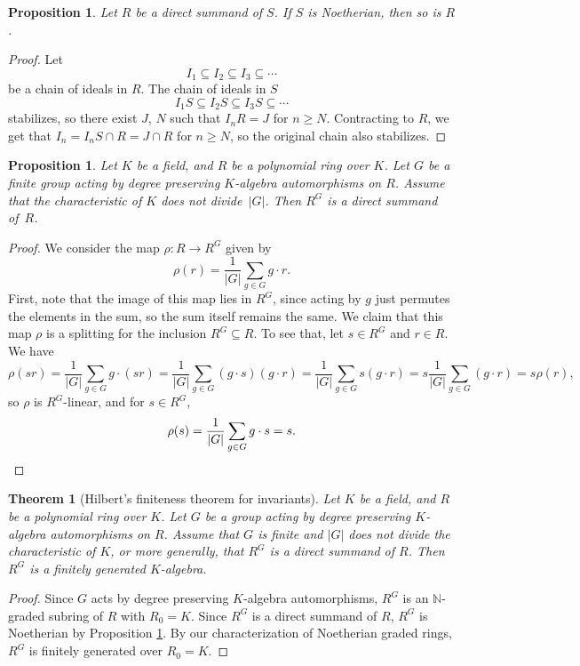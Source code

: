 \documentclass{amsart}[12pt]
\newcommand{\NN}{\mathbb{N}}
\numberwithin{equation}{section}
\theoremstyle{plain} %
\newtheorem{theorem}[equation]{Theorem}
\newtheorem{proposition}[equation]{Proposition}
\theoremstyle{definition}
\theoremstyle{remark}
\begin{document}
\begin{proposition}\label{direct summand noetherian}
	Let $R$ be a direct summand of $S$. If $S$ is Noetherian, then so is $R$.
\end{proposition}

\begin{proof}
	Let 
	\[I_1\subseteq I_2 \subseteq I_3 \subseteq \cdots\] 
	be a chain of ideals in $R$. The chain of ideals in $S$
	\[I_1 S \subseteq I_2 S \subseteq I_3 S \subseteq \cdots\] 
	stabilizes, so there exist $J$, $N$ such that $I_n R = J$ for $n \geqslant N$. Contracting to $R$, we get that $I_n = I_n S \cap R = J \cap R$ for $n\geqslant N$, so the original chain also stabilizes.
\end{proof}


\begin{proposition}
Let $K$ be a field, and $R$ be a polynomial ring over $K$. Let $G$ be a finite group acting by degree preserving $K$-algebra automorphisms on $R$. Assume that the characteristic of $K$ does not divide~$|G|$. Then $R^G$ is a direct summand of~$R$.
\end{proposition}

\begin{proof}
	We consider the map $\rho: R \to R^G$ given by 
	\[\rho(r)=\frac{1}{|G|} \sum_{g\in G} g\cdot r.\] 
	First, note that the image of this map lies in $R^G$, since acting by $g$ just permutes the elements in the sum, so the sum itself remains the same. We claim that this map $\rho$ is a splitting for the inclusion $R^G \subseteq R$. To see that, let $s\in R^G$ and $r\in R$. We have 
	\[
	\rho(sr)=\frac{1}{|G|} \sum_{g\in G} g\cdot (sr) =\frac{1}{|G|} \sum_{g\in G} (g\cdot s)(g\cdot r) =\frac{1}{|G|} \sum_{g\in G} s(g\cdot r) = s \frac{1}{|G|} \sum_{g\in G} (g\cdot r) = s \rho(r),\]
	so $\rho$ is $R^G$-linear, and for $s\in R^G$, 
	\[\rho(s)=\frac{1}{|G|} \sum_{g\in G} g\cdot s=s. \qedhere\]
\end{proof}


\begin{theorem}[Hilbert's finiteness theorem for invariants]
Let $K$ be a field, and $R$ be a polynomial ring over $K$. Let $G$ be a group acting by degree preserving $K$-algebra automorphisms on $R$. Assume that $G$ is finite and  $|G|$ does not divide the characteristic of $K$, or more generally, that $R^G$ is a direct summand of $R$. Then $R^G$ is a finitely generated $K$-algebra.
\end{theorem}

\begin{proof}
	Since $G$ acts by degree preserving $K$-algebra automorphisms, $R^G$ is an $\NN$-graded subring of $R$ with $R_0=K$. Since $R^G$ is a direct summand of $R$, $R^G$ is Noetherian by Proposition \ref{direct summand noetherian}. By our characterization of Noetherian graded rings, $R^G$ is finitely generated over $R_0=K$.
\end{proof}
\end{document}
